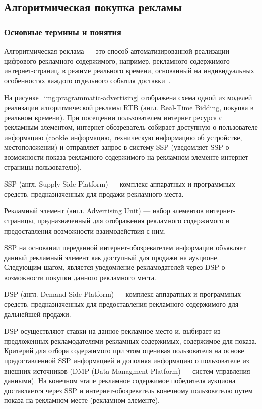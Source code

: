 \subsection{Алгоритмическая покупка рекламы}
\subsubsection{Основные термины и понятия}

Алгоритмическая реклама --- это способ автоматизированной реализации цифрового рекламного содержимого,
например, рекламного содержимого интернет-страниц, в режиме реального времени, основанный на индивидуальных 
особенностях каждого отдельного события доставки~\autocite*[]{online:programmatic}.


На рисунке~\ref{img:pragrammatic-advertising} отображена схема одной из моделей реализации алгоритмической рекламы
RTB (англ. Real-Time Bidding, покупка в реальном времени). При посещении пользователем интернет ресурса с рекламным
элементом, интернет-обозреватель собирает доступную о пользователе информацию (cookie информацию, техническую информацию об 
устройстве, местоположении) и отправляет запрос в систему SSP (уведомляет SSP о возможности показа рекламного
содержимого на рекламном элементе интернет-страницы пользователю).

SSP (англ. Supply Side Platform) --- комплекс аппаратных и программных средств, предназначенных для продажи 
рекламного места.

Рекламный элемент (англ. Advertising Unit) --- набор элементов интернет-страницы, предназначенный для 
отображения рекламного содержимого и предоставления возможности взаимодействия с ним.

SSP на основании переданной интернет-обозревателем информации объявляет данный рекламный элемент как доступный для 
продажи на аукционе. Следующим шагом, является уведомление рекламодателей через DSP о возможности покупки
данного рекламного места.

DSP (англ. Demand Side Platform) --- комплекс аппаратных и программных средств, предназначенных для предоставления
рекламного содержимого для дальнейшей продажи.

DSP осуществляют ставки на данное рекламное место и, выбирает из предложенных рекламодателями рекламных содержимых,
содержимое для показа. Критерий для отбора содержимого  при этом оценивая пользователя на основе предоставленной
SSP информацией и дополняя информацию о пользователе из внешних источников (DMP (Data Managment Platform) --- 
систем управления данными). На конечном этапе рекламное содержимое победителя аукциона доставляется через SSP и
интернет-обозреватель конечному пользователю путем показа на рекламном месте (рекламном элементе).

